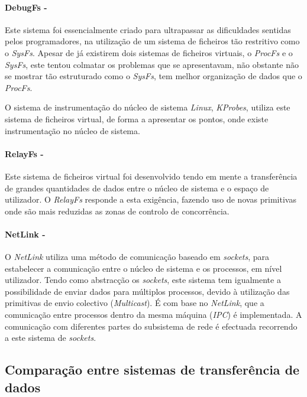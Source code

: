 \paragraph*{DebugFs - }\label{cap:DebugFs_overview}

Este sistema foi essencialmente criado para ultrapassar as dificuldades sentidas pelos programadores, na utilização de um sistema de ficheiros tão restritivo como o \textit{SysFs}.
Apesar de já existirem dois sistemas de ficheiros virtuais, o \textit{ProcFs} e o \textit{SysFs}, este tentou colmatar os problemas que se apresentavam, não obstante não se mostrar tão estruturado como o \textit{SysFs}, tem melhor organização de dados que o \textit{ProcFs}.

O sistema de instrumentação do núcleo de sistema \textit{Linux}, \textit{KProbes}, utiliza este sistema de ficheiros virtual, de forma a apresentar os pontos, onde existe instrumentação no núcleo de sistema.

\paragraph*{RelayFs - }\label{cap:RelayFs_overview}

Este sistema de ficheiros virtual foi desenvolvido tendo em mente a transferência de grandes quantidades de dados entre o núcleo de sistema e o espaço de utilizador.
O \textit{RelayFs} responde a esta exigência, fazendo uso de novas primitivas onde são mais reduzidas as zonas de controlo de concorrência\cite{Donovan2007,To03relayfs:an}.

\paragraph*{NetLink - }\label{cap:NetLink_overview}
O \textit{NetLink} utiliza uma método de comunicação baseado em \textit{sockets}, para estabelecer a comunicação entre o núcleo de sistema e os processos, em nível utilizador. 
 Tendo como abstracção os \textit{sockets}, este sistema tem igualmente a possibilidade de enviar dados para múltiplos processos, devido à utilização das primitivas de envio colectivo (\textit{Multicast}).
 É com base no \textit{NetLink}, que a comunicação entre processos dentro da mesma máquina (\textit{IPC}) é implementada.
 A comunicação com diferentes partes do subsistema de rede é efectuada recorrendo a este sistema de \textit{sockets}.


\subsection{Comparação entre sistemas de transferência de dados}

